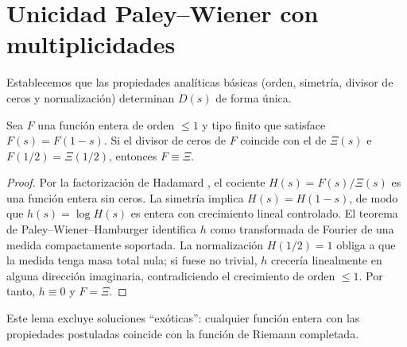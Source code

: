 \section{Unicidad Paley--Wiener con multiplicidades}

Establecemos que las propiedades analíticas básicas (orden, simetría, divisor
de ceros y normalización) determinan $D(s)$ de forma única.

\begin{lemma}[Unicidad]\label{lem:paper-uniqueness}
Sea $F$ una función entera de orden $\leqslant 1$ y tipo finito que satisface
$F(s)=F(1-s)$.  Si el divisor de ceros de $F$ coincide con el de $\Xi(s)$ e
$F(1/2)=\Xi(1/2)$, entonces $F\equiv \Xi$.
\end{lemma}

\begin{proof}
Por la factorización de Hadamard
\cite[Chap.~II]{Tate1967}, el cociente $H(s)=F(s)/\Xi(s)$ es una función entera
sin ceros.  La simetría implica $H(s)=H(1-s)$, de modo que $h(s)=\log H(s)$ es
entera con crecimiento lineal controlado.  El teorema de
Paley--Wiener--Hamburger
\cite[Thm.~5]{Hamburger1921}
identifica $h$ como transformada de Fourier de una medida compactamente
soportada.  La normalización $H(1/2)=1$ obliga a que la medida tenga masa total
nula; si fuese no trivial, $h$ crecería linealmente en alguna dirección
imaginaria, contradiciendo el crecimiento de orden $\leqslant1$.  Por tanto,
$h\equiv0$ y $F=\Xi$.
\end{proof}

Este lema excluye soluciones ``exóticas'': cualquier función entera con las
propiedades postuladas coincide con la función de Riemann completada.
